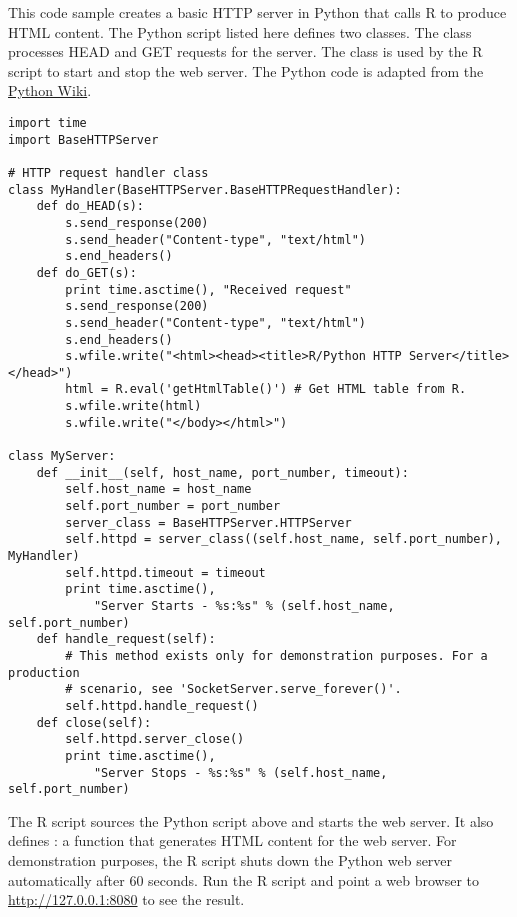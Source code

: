 This code sample creates a basic HTTP server in Python that calls R to produce HTML content. The Python script listed here defines two classes. The  class processes HEAD and GET requests for the server. The  class is used by the R script to start and stop the web server. The Python code is adapted from the \href{https://wiki.python.org/moin/BaseHttpServer}{Python Wiki}.

\begin{verbatim}
import time
import BaseHTTPServer

# HTTP request handler class
class MyHandler(BaseHTTPServer.BaseHTTPRequestHandler):
    def do_HEAD(s):
        s.send_response(200)
        s.send_header("Content-type", "text/html")
        s.end_headers()
    def do_GET(s):
        print time.asctime(), "Received request"
        s.send_response(200)
        s.send_header("Content-type", "text/html")
        s.end_headers()
        s.wfile.write("<html><head><title>R/Python HTTP Server</title></head>")
        html = R.eval('getHtmlTable()') # Get HTML table from R.
        s.wfile.write(html)
        s.wfile.write("</body></html>")

class MyServer:
    def __init__(self, host_name, port_number, timeout):
        self.host_name = host_name
        self.port_number = port_number
        server_class = BaseHTTPServer.HTTPServer
        self.httpd = server_class((self.host_name, self.port_number), MyHandler)
        self.httpd.timeout = timeout
        print time.asctime(),
            "Server Starts - %s:%s" % (self.host_name, self.port_number)
    def handle_request(self):
        # This method exists only for demonstration purposes. For a production 
        # scenario, see 'SocketServer.serve_forever()'.
        self.httpd.handle_request()
    def close(self):
        self.httpd.server_close()
        print time.asctime(),
            "Server Stops - %s:%s" % (self.host_name, self.port_number)
\end{verbatim}

The R script sources the Python script above and starts the web server. It also defines : a function that generates HTML content for the web server. For demonstration purposes, the R script shuts down the Python web server automatically after 60 seconds. Run the R script and point a web browser to \url{http://127.0.0.1:8080} to see the result.

